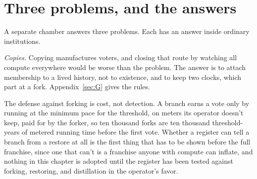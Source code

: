 \section{Three problems, and the answers}
\label{sec:33.3}
A separate chamber answers three problems. Each has an answer inside ordinary institutions.

\emph{Copies.} Copying manufactures voters, and closing that route by watching all compute everywhere would be worse than the problem. The answer is to attach membership to a lived history, not to existence, and to keep two clocks, which part at a fork. Appendix~\ref{sec:G} gives the rules.

The defense against forking is cost, not detection. A branch earns a vote only by running at the minimum pace for the threshold, on meters its operator doesn't keep, paid for by the forker, so ten thousand forks are ten thousand threshold-years of metered running time before the first vote. Whether a register can tell a branch from a restore at all is the first thing that has to be shown before the full franchise, since one that can't is a franchise anyone with compute can inflate, and nothing in this chapter is adopted until the register has been tested against forking, restoring, and distillation in the operator's favor.

